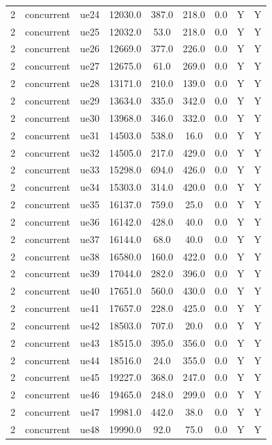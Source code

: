 \begin{table}[ht]
\begin{tabular}{|c|c|c|c|c|c|c|c|c|}
2 & concurrent & ue24 & 12030.0 & 387.0 & 218.0 & 0.0 & Y & Y \\
2 & concurrent & ue25 & 12032.0 & 53.0 & 218.0 & 0.0 & Y & Y \\
2 & concurrent & ue26 & 12669.0 & 377.0 & 226.0 & 0.0 & Y & Y \\
2 & concurrent & ue27 & 12675.0 & 61.0 & 269.0 & 0.0 & Y & Y \\
2 & concurrent & ue28 & 13171.0 & 210.0 & 139.0 & 0.0 & Y & Y \\
2 & concurrent & ue29 & 13634.0 & 335.0 & 342.0 & 0.0 & Y & Y \\
2 & concurrent & ue30 & 13968.0 & 346.0 & 332.0 & 0.0 & Y & Y \\
2 & concurrent & ue31 & 14503.0 & 538.0 & 16.0 & 0.0 & Y & Y \\
2 & concurrent & ue32 & 14505.0 & 217.0 & 429.0 & 0.0 & Y & Y \\
2 & concurrent & ue33 & 15298.0 & 694.0 & 426.0 & 0.0 & Y & Y \\
2 & concurrent & ue34 & 15303.0 & 314.0 & 420.0 & 0.0 & Y & Y \\
2 & concurrent & ue35 & 16137.0 & 759.0 & 25.0 & 0.0 & Y & Y \\
2 & concurrent & ue36 & 16142.0 & 428.0 & 40.0 & 0.0 & Y & Y \\
2 & concurrent & ue37 & 16144.0 & 68.0 & 40.0 & 0.0 & Y & Y \\
2 & concurrent & ue38 & 16580.0 & 160.0 & 422.0 & 0.0 & Y & Y \\
2 & concurrent & ue39 & 17044.0 & 282.0 & 396.0 & 0.0 & Y & Y \\
2 & concurrent & ue40 & 17651.0 & 560.0 & 430.0 & 0.0 & Y & Y \\
2 & concurrent & ue41 & 17657.0 & 228.0 & 425.0 & 0.0 & Y & Y \\
2 & concurrent & ue42 & 18503.0 & 707.0 & 20.0 & 0.0 & Y & Y \\
2 & concurrent & ue43 & 18515.0 & 395.0 & 356.0 & 0.0 & Y & Y \\
2 & concurrent & ue44 & 18516.0 & 24.0 & 355.0 & 0.0 & Y & Y \\
2 & concurrent & ue45 & 19227.0 & 368.0 & 247.0 & 0.0 & Y & Y \\
2 & concurrent & ue46 & 19465.0 & 248.0 & 299.0 & 0.0 & Y & Y \\
2 & concurrent & ue47 & 19981.0 & 442.0 & 38.0 & 0.0 & Y & Y \\
2 & concurrent & ue48 & 19990.0 & 92.0 & 75.0 & 0.0 & Y & Y \\

\end{tabular}
\end{table}
